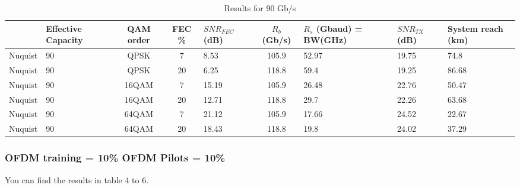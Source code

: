 \documentclass{article}
\begin{document}
\begin{table}[htb!]
    \begin{tabular}{|c|p{1.5cm}|c|c|p{1.5cm}|c|p{1.5cm}|p{1.5cm}|p{1cm}|}
    \hline
         & Effective Capacity & QAM order & FEC \%  &  $SNR_{FEC}$ (dB) & $R_b$ (Gb/s) & $R_s$ (Gbaud) = BW(GHz) & $SNR_{TX}$ (dB) & System reach (km) \\ \hline
         Nuquist & 90 & QPSK & 7 & 8.53 & 105.9 & 52.97 & 19.75 & 74.8 \\ \hline
         Nuquist & 90 & QPSK & 20 & 6.25 & 118.8 & 59.4 & 19.25 & 86.68 \\ \hline
         Nuquist & 90 & 16QAM & 7 & 15.19 & 105.9 & 26.48 & 22.76 & 50.47 \\ \hline
         Nuquist & 90 & 16QAM & 20 & 12.71 & 118.8 & 29.7 & 22.26 & 63.68 \\ \hline
         Nuquist & 90 & 64QAM & 7 & 21.12 & 105.9 & 17.66 & 24.52 &  22.67 \\ \hline
         Nuquist & 90 & 64QAM & 20 & 18.43 & 118.8 & 19.8 & 24.02 & 37.29 \\ \hline

    \end{tabular}
    \caption{Results for 90 Gb/s}
\end{table}


\subsubsection{OFDM training = 10\% OFDM Pilots = 10\%}

You can find the results in table 4 to 6.
\end{document}
